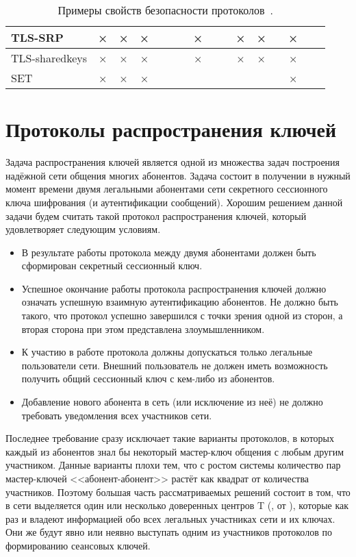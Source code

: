 \begin{landscape}
{\begin{table}
\begin{tabular}{|l|c|c|c|c|c|c|c|c|c|c|c|c|c|c|c|}
        \hline
        TLS-SRP                & × & × & × &   &   &   & × &   &   &  × &  × &    &  × &    &    \\
        \hline
        TLS-sharedkeys         & × & × & × &   &   &   & × &   &   &  × &  × &    &  × &    &    \\
        \hline
        SET                    & × & × & × &   &   &   &   &   &   &    &    &    &  × &    &    \\
        \hline
    \end{tabular}
    \caption{Примеры свойств безопасности протоколов~\cite{Cheremushkin:2009}.}
    \label{tab:protocols-properties}
\end{table}
}
\end{landscape}

\section{Протоколы распространения ключей}

Задача распространения ключей является одной из множества задач построения надёжной сети общения многих абонентов. Задача состоит в получении в нужный момент времени двумя легальными абонентами сети секретного сессионного ключа шифрования (и аутентификации сообщений). Хорошим решением данной задачи будем считать такой протокол распространения ключей, который удовлетворяет следующим условиям.

\begin{itemize}
	\item В результате работы протокола между двумя абонентами должен быть сформирован секретный сессионный ключ.
	\item Успешное окончание работы протокола распространения ключей должно означать успешную взаимную аутентификацию абонентов. Не должно быть такого, что протокол успешно завершился с точки зрения одной из сторон, а вторая сторона при этом представлена злоумышленником.
	\item К участию в работе протокола должны допускаться только легальные пользователи сети. Внешний пользователь не должен иметь возможность получить общий сессионный ключ с кем-либо из абонентов.
	\item Добавление нового абонента в сеть (или исключение из неё) не должно требовать уведомления всех участников сети.
\end{itemize}

Последнее требование сразу исключает такие варианты протоколов, в которых каждый из абонентов знал бы некоторый мастер-ключ общения с любым другим участником. Данные варианты плохи тем, что с ростом системы количество пар мастер-ключей <<абонент-абонент>> растёт как квадрат от количества участников. Поэтому большая часть рассматриваемых решений состоит в том, что в сети выделяется один или несколько доверенных центров T (, от ), которые как раз и владеют информацией обо всех легальных участниках сети и их ключах. Они же будут явно или неявно выступать одним из участников протоколов по формированию сеансовых ключей.

